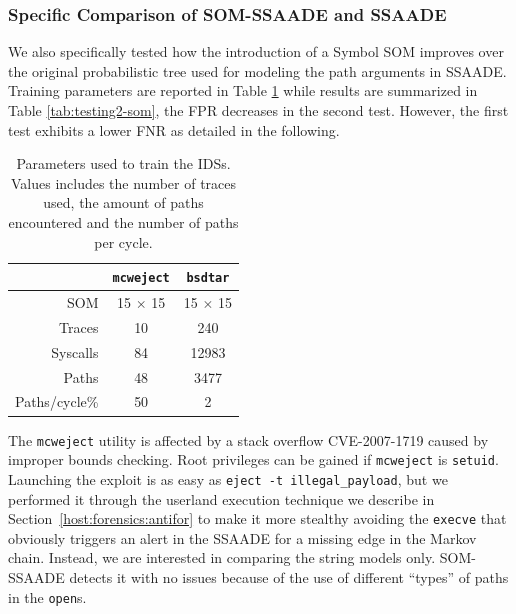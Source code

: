 \subsubsection{Specific Comparison of SOM-\ac{SSAADE} and \ac{SSAADE}}
\label{host:improving:test_som}
We also specifically tested how the introduction of a Symbol \ac{SOM} improves over the original probabilistic tree used for modeling the path arguments in \ac{SSAADE}. Training parameters are reported in Table \ref{tab:testing-som} while results are summarized in Table \ref{tab:testing2-som}, the \ac{FPR} decreases in the second test. However, the first test exhibits a lower \ac{FNR} as detailed in the following.

\begin{table}[p]
  \centering
  \begin{tabular*}{\columnwidth}{@{\extracolsep{\fill}}rcc}

    \toprule

    & \texttt{mcweject} & \texttt{bsdtar} \\

    \midrule

    SOM & 15 $\times$ 15 & 15 $\times$ 15\\
    Traces & 10 & 240 \\
    Syscalls & 84 & 12983\\
    Paths & 48 & 3477 \\
    Paths/cycle\% & 50 & 2 \\
    \bottomrule
  \end{tabular*}
  
  \caption{Parameters used to train the \acp{IDS}. Values includes the number of traces used, the amount of paths encountered and the number of paths per cycle.}
  \label{tab:testing-som}
\end{table}

The \texttt{mcweject} utility is affected by a stack overflow CVE-2007-1719 caused by improper bounds checking. Root privileges can be gained if \texttt{mcweject} is \texttt{setuid}. Launching the exploit is as easy as \texttt{eject -t illegal\_payload}, but we performed it through the userland execution technique we describe in Section~\ref{host:forensics:antifor} to make it more stealthy avoiding the \texttt{execve} that obviously triggers an alert in the \ac{SSAADE} for a missing edge in the Markov chain. Instead, we are interested in comparing the string models only. SOM-\ac{SSAADE} detects it with no issues because of the use of different ``types'' of paths in the \texttt{open}s.

